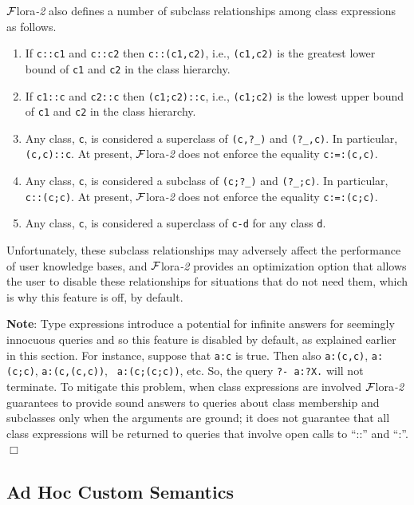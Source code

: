 \documentclass[11pt]{article}
\newcommand{\FLORA}{{\mbox{\sc ${\cal F}${lora}\rm\emph{-2}}}\xspace}
\newcommand{\FLSYSTEM}{\FLORA}
\begin{document}
\FLSYSTEM also defines a number of subclass relationships among class
expressions as follows.
\begin{enumerate}
\item If {\tt c::c1} and {\tt c::c2} then {\tt c::(c1,c2)}, i.e.,
  {\tt (c1,c2)} is the greatest lower bound of {\tt c1} and {\tt c2} in the
  class hierarchy.
\item If {\tt c1::c} and {\tt c2::c} then {\tt (c1;c2)::c}, i.e.,
  {\tt (c1;c2)} is the lowest upper bound of {\tt c1} and {\tt c2} in the
  class hierarchy. 
\item Any class, {\tt c}, is considered a superclass of {\tt (c,?\_)} and
  {\tt (?\_,c)}. In particular, {\tt (c,c)::c}. At present, \FLSYSTEM does not
  enforce the equality {\tt c:=:(c,c)}.      
\item Any class, {\tt c}, is considered a subclass of {\tt (c;?\_)} and
  {\tt (?\_;c)}. In particular, {\tt c::(c;c)}. At present, \FLSYSTEM does not
  enforce the equality {\tt c:=:(c;c)}.      
\item Any class, {\tt c}, is considered a superclass of {\tt c-d} for any
  class {\tt d}.   
\end{enumerate}
Unfortunately, these subclass relationships may adversely affect the
performance of user knowledge bases, and \FLSYSTEM provides an optimization
option that allows the user to disable these relationships for situations
that do not need them, which is why this feature is off, by default.

\noindent
{\bf Note}: Type expressions introduce a potential for infinite answers
for seemingly innocuous queries and so this feature is disabled by default,
as explained earlier in this section. For instance, suppose that {\tt a:c} is
true. Then also {\tt a:(c,c)}, {\tt a:(c;c)}, {\tt a:(c,(c,c))}, {\tt
  a:(c;(c;c))}, etc. So, the query {\tt ?- a:?X.} will not terminate.
To mitigate this problem, when class expressions are involved
\FLSYSTEM guarantees to provide sound answers to queries about class
membership and subclasses only when the arguments are ground; it does
not guarantee that all class expressions will be returned to 
queries that involve open calls to ``::'' and ``:''.
\hfill$\Box$


\subsection{Ad Hoc Custom Semantics}\label{sec-ad-hoc-semantics}
\end{document}
